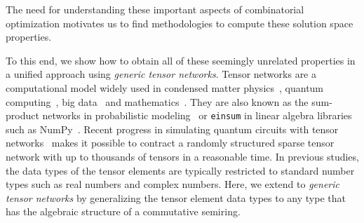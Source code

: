 \documentclass[onefignum, onetabnum]{siamart190516}
\newcommand{\<}{\langle}
\renewcommand{\>}{\rangle}
\newcommand{\blue}[1]{[{\bf  \color{blue}{JG: #1}}]}
\newcommand{\purple}[1]{[{\bf  \color{purple}{MC: #1}}]}
\newcounter{example}
\begin{document}
The need for understanding these important aspects of combinatorial optimization motivates us to find methodologies to compute these solution space properties.

To this end, we show how to obtain all of these seemingly unrelated properties in a unified approach using
\textit{generic tensor networks}. Tensor networks are a computational model widely used in condensed matter physics~\cite{Orus2014}, quantum computing~\cite{Markov2008}, big data~\cite{Cichocki2014} and mathematics~\cite{Oseledets2011}.
They are also known as the sum-product networks in probabilistic modeling~\cite{Bishop2006} or \texttt{einsum} in linear algebra libraries such as NumPy~\cite{Harris2020}.
Recent progress in simulating quantum circuits with tensor networks~\cite{Gray2021, Pan2021, Kalachev2021} makes it possible to contract a randomly structured sparse tensor network with up to thousands of tensors in a reasonable time.
In previous studies, the data types of the tensor elements are typically restricted to standard number types such as real numbers and complex numbers.
Here, we extend to \textit{generic tensor networks} by generalizing the tensor element data types to any type that has the algebraic structure of a commutative semiring.
\end{document}
